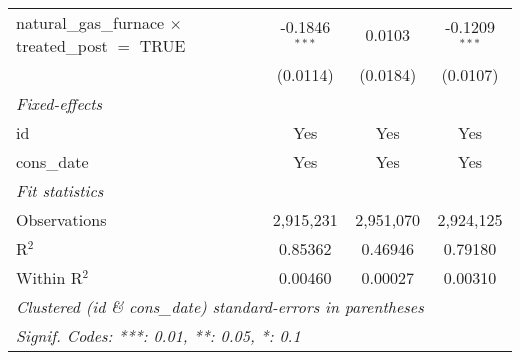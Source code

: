 \begin{tabular}{lccc}
   natural\_gas\_furnace $\times$ treated\_post $=$ TRUE     & -0.1846$^{***}$ & 0.0103         & -0.1209$^{***}$\\   
                                                             & (0.0114)        & (0.0184)       & (0.0107)\\   
   \midrule
   \emph{Fixed-effects}\\
   id                                                        & Yes             & Yes            & Yes\\  
   cons\_date                                                & Yes             & Yes            & Yes\\  
   \midrule
   \emph{Fit statistics}\\
   Observations                                              & 2,915,231       & 2,951,070      & 2,924,125\\  
   R$^2$                                                     & 0.85362         & 0.46946        & 0.79180\\  
   Within R$^2$                                              & 0.00460         & 0.00027        & 0.00310\\  
   \midrule \midrule
   \multicolumn{4}{l}{\emph{Clustered (id \& cons\_date) standard-errors in parentheses}}\\
   \multicolumn{4}{l}{\emph{Signif. Codes: ***: 0.01, **: 0.05, *: 0.1}}\\
\end{tabular}
\par\endgroup


